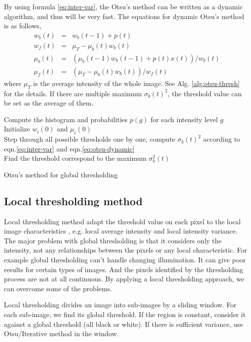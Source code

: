 By using formula \ref{eq:inter-var}, the Otsu's method can be written as a dynamic algorithm, and thus will be very fast. The equations for dynamic Otsu's method is as follows, 
\begin{equation} \label{eq:otsu-dynamic}
\begin{array}{lll}
	w_b(t) & = & w_b(t-1) + p(t) \\
	w_f(t) & = & \mu_T - \mu_b(t)w_b(t) \\
	\mu_b(t) & = & (\mu_b(t-1)w_b(t-1) + p(t)x(t))/w_b(t)\\
	\mu_f(t) & = & (\mu_T - \mu_b(t)w_b(t))/w_f(t)
\end{array}
\end{equation}
where $\mu_T$ is the average intensity of the whole image. See Alg. \ref{alg:otsu-thresh} for the details. If there are multiple maximum $\sigma_b(t)^2$, the threshold value can be set as the average of them.
\begin{algorithm}
\SetAlgoLined
{}
Compute the histogram and probabilities $p(g)$ for each intensity level $g$\\
Initialize $w_i(0)$ and $\mu_i(0)$\\
Step through all possible thresholds one by one, compute $\sigma_b(t)^2$ according to eqn.\ref{eq:inter-var} and eqn.\ref{eq:otsu-dynamic}\\
Find the threshold correspond to the maximum $\sigma_b^2(t)$
\caption{Otsu's method for global thresholding}
\label{alg:otsu-thresh}
\end{algorithm}
\subsection{Local thresholding method}
Local thresholding method adapt the threshold value on each pixel to the local image characteristics \cite{kallergi1992image}, e.g. local average intensity and local intensity variance. The major problem with global thresholding is that it considers only the intensity, not any relationships between the pixels or any local characteristic. For example global thresholding can't handle changing illumination. It can give poor results for certain types of images. And the pixels identified by the thresholding process are not at all continuous. By applying a local thresholding approach, we can overcome some of the problems.

Local thresholding divides an image into sub-images by a sliding window. For each sub-image, we find its global threshold. If the region is constant, consider it against a global threshold (all black or white). If there is sufficient variance, use Otsu/Iterative method in the window. 

